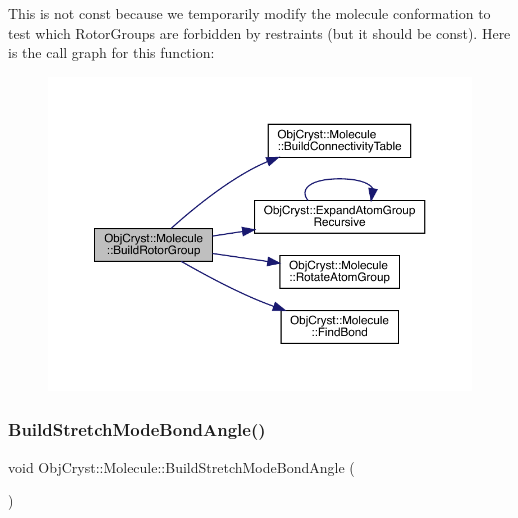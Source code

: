 This is not const because we temporarily modify the molecule conformation to test which Rotor\+Groups are forbidden by restraints (but it should be const). Here is the call graph for this function\+:
\nopagebreak
\begin{figure}[H]
\begin{center}
\leavevmode
\includegraphics[width=350pt]{class_obj_cryst_1_1_molecule_a3642fa8104faa1ce84a977600f9d1aeb_cgraph}
\end{center}
\end{figure}
\mbox{\label{class_obj_cryst_1_1_molecule_a3d507a4e25612a7412cbcc84b5a831ae}} 
\subsubsection{\texorpdfstring{BuildStretchModeBondAngle()}{BuildStretchModeBondAngle()}}
{\footnotesize\ttfamily void Obj\+Cryst\+::\+Molecule\+::\+Build\+Stretch\+Mode\+Bond\+Angle (\begin{DoxyParamCaption}{ }\end{DoxyParamCaption})}

